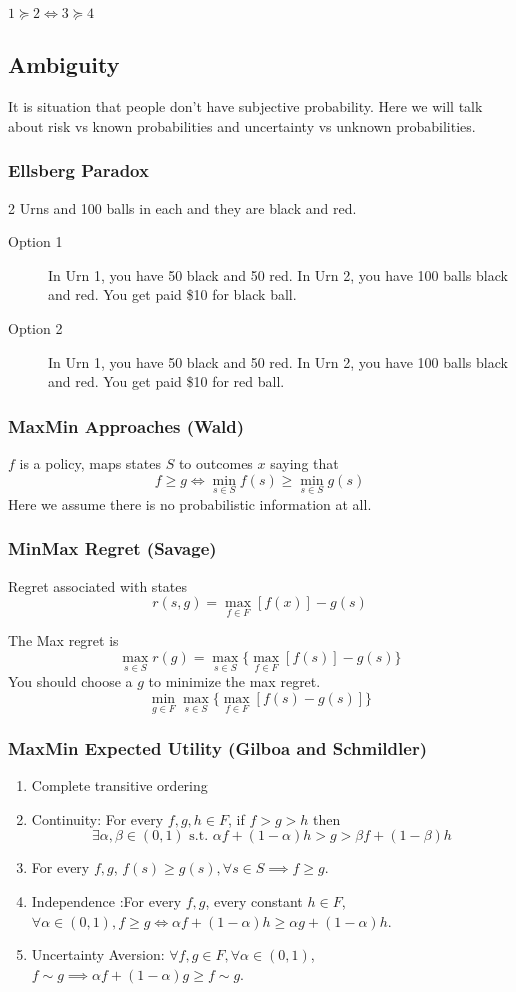 \documentclass[11pt, a4paper, oneside]{article}
\theoremstyle{definition}
\theoremstyle{proposition}
\theoremstyle{corollary}
\theoremstyle{lemma}
\theoremstyle{theorem}
\begin{document}
$1 \succeq 2 \iff 3 \succeq 4$

\subsection{Ambiguity}
It is situation that people don't have subjective probability. Here we will talk about risk vs known probabilities and uncertainty vs unknown probabilities. 

\subsubsection{Ellsberg Paradox}
2 Urns and 100 balls in each and they are black and red. 
\begin{description}
\item[Option 1] In Urn 1, you have 50 black and 50 red. In Urn 2, you have 100 balls black and red. You get paid \$10 for black ball. 
\item[Option 2] In Urn 1, you have 50 black and 50 red. In Urn 2, you have 100 balls black and red. You get paid \$10 for red ball. 
\end{description}


\subsubsection{MaxMin Approaches (Wald)}
$f$ is a policy, maps states $S$ to outcomes $x$ saying that 
$$f\geq g \iff \min_{s\in S} f(s) \geq \min_{s\in S}g(s)$$
Here we assume there is no probabilistic information at all. 

\subsubsection{MinMax Regret (Savage)}
Regret associated with states 
$$r(s, g) = \max_{f \in F} [f(x)] - g(s)$$

The Max regret is 
$$\max_{s \in S} r(g)  =\max_{s\in S}\{ \max_{f\in F}[f(s)] - g(s)\}$$
You should choose a $g$ to minimize the max regret. 
$$\min_{g\in F} \max_{s \in S}\{\max_{f \in F}[f(s) - g(s)]\}$$

\subsubsection{MaxMin Expected Utility (Gilboa and Schmildler)}
\begin{enumerate}
\item Complete transitive ordering
\item Continuity: For every $f, g, h \in F$, if $f > g > h$ then
$$\exists \alpha, \beta \in (0, 1) \text{ s.t. } \alpha f + (1- \alpha) h > g > \beta f + (1- \beta)h$$
\item For every $f, g$, $f(s) \geq g(s), \forall s \in S \implies f \geq g$. 
\item Independence :For every $f, g$, every constant $h \in F$, $\forall \alpha \in (0, 1), f \geq g \iff \alpha f + (1-  \alpha)h \geq \alpha g + (1- \alpha) h$.  
\item Uncertainty Aversion: $\forall f, g \in F, \forall \alpha \in (0, 1)$, $f \sim g \implies \alpha f + (1- \alpha)g \geq f \sim g$. 
\end{enumerate}
\end{document}
